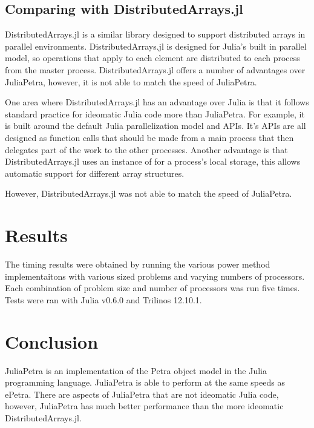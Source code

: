 \documentclass[acmsmall]{acmart}
\newcommand{\juliaSnippet}[1]{\texttt{\detokenize{#1}}}
\begin{document}
\subsection{Comparing with DistributedArrays.jl}

DistributedArrays.jl is a similar library designed to support distributed arrays in parallel environments.
\cite{DAGithub}
DistributedArrays.jl is designed for Julia's built in parallel model, so operations that apply to
each element are distributed to each process from the master process.
DistributedArrays.jl offers a number of advantages over JuliaPetra, however, it is not able to
match the speed of JuliaPetra.

One area where DistributedArrays.jl has an advantage over Julia is that it follows standard
practice for ideomatic Julia code more than JuliaPetra.
For example, it is built around the default Julia parallelization model and APIs.
It's APIs are all designed as function calls that should be made from a main process that
then delegates part of the work to the other processes. %
Another advantage is that DistributedArrays.jl uses an instance of \juliaSnippet{AbstractArray}
for a process's local storage, this allows automatic support for different array structures.

However, DistributedArrays.jl was not able to match the speed of JuliaPetra.

\section{Results}
\label{section:Results}


The timing results were obtained by running the various power method implementaitons
with various sized problems and varying numbers of processors.
Each combination of problem size and number of processors was run five times.
Tests were ran with Julia v0.6.0 and Trilinos 12.10.1.


\section{Conclusion}

JuliaPetra is an implementation of the Petra object model in the Julia programming language.
JuliaPetra is able to perform at the same speeds as ePetra.
There are aspects of JuliaPetra that are not ideomatic Julia code, however, JuliaPetra has much
better performance than the more ideomatic DistributedArrays.jl.



\end{document}
